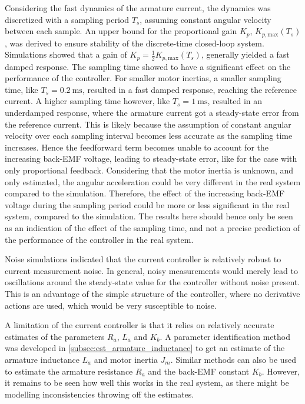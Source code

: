 Considering the fast dynamics of the armature current, the dynamics was discretized with a sampling period $T_s$, assuming constant angular velocity between each sample. An upper bound for the proportional gain $K_p$, $K_{p,\text{max}}(T_s)$, was derived to ensure stability of the discrete-time closed-loop system. Simulations showed that a gain of $K_p = \frac{1}{2} K_{p,\text{max}}(T_s)$, generally yielded a fast damped response. The sampling time showed to have a significant effect on the performance of the controller. For smaller motor inertias, a  smaller sampling time, like $T_s = \SI{0.2}{\milli\second}$, resulted in a fast damped response, reaching the reference current. A higher sampling time however, like $T_s = \SI{1}{\milli\second}$, resulted in an underdamped response, where the armature current got a steady-state error from the reference current. This is likely because the assumption of constant angular velocity over each sampling
interval becomes less accurate as the sampling time increases. Hence the feedforward term becomes unable to account for the increasing back-EMF voltage, leading to steady-state error, like for the case with only proportional feedback. Considering that the motor inertia is unknown, and only estimated, the angular acceleration could be very different in the real system compared to the simulation. Therefore, the effect of the increasing back-EMF voltage during the sampling period could be more or less significant in the real system, compared to the simulation. The results here should hence only be seen as an indication of the effect of the sampling time, and not a precise prediction of the performance of the controller in the real system.

Noise simulations indicated that the current controller is relatively robust to current measurement noise. In general, noisy measurements would merely lead to oscillations around the steady-state value for the controller without noise present. This is an advantage of the simple structure of the controller, where no derivative actions are used, which would be very susceptible to noise.

A limitation of the current controller is that it relies on relatively accurate estimates of the parameters $R_a$, $L_a$ and $K_b$. A parameter identification method was developed in \cref{subsec:est_armature_inductance} to get an estimate of the armature inductance $L_a$ and motor inertia $J_m$. Similar methods can also be used to estimate the armature resistance $R_a$ and the back-EMF constant $K_b$. However, it remains to be seen how well this works in the real system, as there might be modelling inconsistencies throwing off the estimates.

